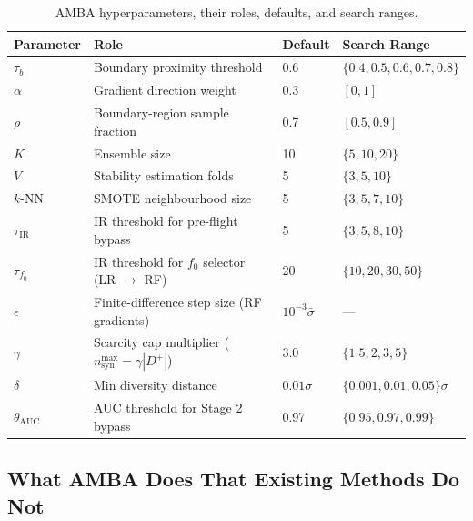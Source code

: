 \documentclass[11pt,a4paper]{article}
\newcommand{\Dplus}{D^{+}}
\newcommand{\IR}{\mathrm{IR}}
\begin{document}
\begin{table}[ht]
\centering
\caption{AMBA hyperparameters, their roles, defaults, and search ranges.}
\begin{tabular}{llll}
\toprule
\textbf{Parameter} & \textbf{Role} & \textbf{Default} & \textbf{Search Range} \\
\midrule
$\tau_b$      & Boundary proximity threshold                     & 0.6         & $\{0.4, 0.5, 0.6, 0.7, 0.8\}$ \\
$\alpha$      & Gradient direction weight                         & 0.3         & $[0, 1]$ \\
$\rho$        & Boundary-region sample fraction                  & 0.7         & $[0.5, 0.9]$ \\
$K$           & Ensemble size                                     & 10          & $\{5, 10, 20\}$ \\
$V$           & Stability estimation folds                        & 5           & $\{3, 5, 10\}$ \\
$k$-NN        & SMOTE neighbourhood size                          & 5           & $\{3, 5, 7, 10\}$ \\
$\tau_{\IR}$  & IR threshold for pre-flight bypass               & 5           & $\{3, 5, 8, 10\}$ \\
$\tau_{f_0}$  & IR threshold for $f_0$ selector (LR $\to$ RF)    & 20          & $\{10, 20, 30, 50\}$ \\
$\epsilon$    & Finite-difference step size (RF gradients)        & $10^{-3}\bar{\sigma}$ & --- \\
$\gamma$      & Scarcity cap multiplier ($n_{\mathrm{syn}}^{\max} = \gamma|\Dplus|$) & 3.0 & $\{1.5, 2, 3, 5\}$ \\
$\delta$      & Min diversity distance                            & $0.01\bar{\sigma}$ & $\{0.001, 0.01, 0.05\}\bar{\sigma}$ \\
$\theta_{\mathrm{AUC}}$ & AUC threshold for Stage 2 bypass           & 0.97        & $\{0.95, 0.97, 0.99\}$ \\
\bottomrule
\end{tabular}
\end{table}

\subsection{What AMBA Does That Existing Methods Do Not}
\end{document}
